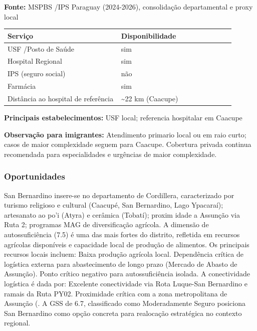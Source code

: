 \textbf{Fonte:} MSPBS /\allowbreak  IPS Paraguay (2024-2026), consolidação
departamental e proxy local

{\def\LTcaptype{none} %
\begin{longtable}{@{}>{\raggedright\arraybackslash}p{0.45\linewidth} >{\raggedright\arraybackslash}p{0.45\linewidth}@{}}
\toprule\noalign{}
Serviço & Disponibilidade \\
\midrule\noalign{}
\endhead
\bottomrule\noalign{}
\endlastfoot
USF /\allowbreak  Posto de Saúde & sim \\
Hospital Regional & sim \\
IPS (seguro social) & não \\
Farmácia & sim \\
Distância ao hospital de referência & \textasciitilde22 km (Caacupe) \\
\end{longtable}
}

\textbf{Principais estabelecimentos:} USF local; referencia hospitalar
em Caacupe

\textbf{Observação para imigrantes:} Atendimento primario local ou em
raio curto; casos de maior complexidade seguem para Caacupe. Cobertura
privada continua recomendada para especialidades e urgências de maior
complexidade.
\newpage

\subsubsection*{Oportunidades}\label{oport-san-bernardino-0316}
San Bernardino insere-se no departamento de Cordillera, caracterizado por turismo religioso e cultural (Caacupé, San Bernardino, Lago Ypacaraí); artesanato ao po'i (Atyra) e cerâmica (Tobatí); proxim idade a Assunção via Ruta 2; programas MAG de diversificação agrícola. A dimensão de autossuficiência (7.5) é uma das mais fortes do distrito, refletida em recursos agrícolas disponíveis e capacidade local de produção de alimentos. Os principais recursos locais incluem: Baixa produção agrícola local. Dependência crítica de logística externa para abastecimento de longo prazo (Mercado de Abasto de Assunção). Ponto crítico negativo para autossuficiência isolada. A conectividade logística é dada por: Excelente conectividade via Rota Luque-San Bernardino e ramais da Ruta PY02. Proximidade crítica com a zona metropolitana de Assunção (. A GSS de 6.7, classificado como Moderadamente Seguro posiciona San Bernardino como opção concreta para realocação estratégica no contexto regional.

